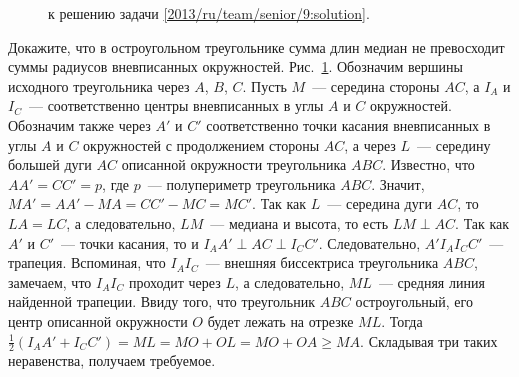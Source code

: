 \ifsolution
\begin{figure}[bt]\centering
    \caption{к решению задачи \ref{2013/ru/team/senior/9:solution}.}
    \label{2013/ru/team/senior/9:solution:fig}
\end{figure}%
\fi %

\problem{}
Докажите, что в остроугольном треугольнике сумма длин медиан не превосходит
суммы радиусов вневписанных окружностей.
\solution
\label{2013/ru/team/senior/9:solution}%
Рис.~\ref{2013/ru/team/senior/9:solution:fig}.
Обозначим вершины исходного треугольника через $A$, $B$, $C$.
Пусть $M$~--- середина стороны $AC$, а $I_A$ и $I_C$~--- соответственно центры
вневписанных в углы $A$ и $C$ окружностей.
Обозначим также через $A'$ и $C'$ соответственно точки касания вневписанных в
углы $A$ и $C$ окружностей с продолжением стороны $AC$, а через $L$~---
середину большей дуги $AC$ описанной окружности треугольника $ABC$.
Известно, что $AA' = CC' = p$, где $p$~--- полупериметр треугольника $ABC$.
Значит, $MA' = AA' - MA = CC' - MC = MC'$.
Так как $L$~--- середина дуги $AC$, то $LA = LC$, а следовательно, $LM$~---
медиана и высота, то есть $LM \perp AC$.
Так как $A'$ и $C'$~--- точки касания, то и $I_A A' \perp AC \perp I_C C'$.
Следовательно, $A' I_A I_C C'$~--- трапеция.
Вспоминая, что $I_A I_C$~--- внешняя биссектриса треугольника $ABC$, замечаем,
что $I_A I_C$ проходит через $L$, а следовательно, $ML$~--- средняя линия
найденной трапеции.
Ввиду того, что треугольник $ABC$ остроугольный, его центр описанной окружности
$O$ будет лежать на отрезке $ML$.
Тогда $\frac{1}{2} (I_A A' + I_C C') = ML = MO + OL = MO + OA \geq MA$.
Складывая три таких неравенства, получаем требуемое.
\endproblem

